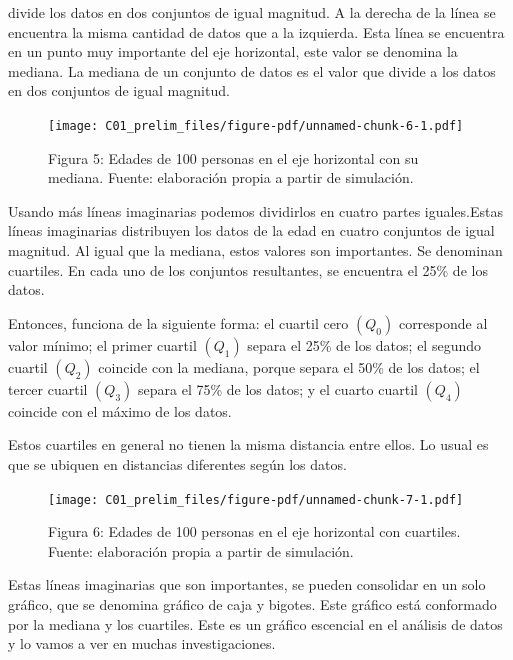 \documentclass[
  letterpaper,
  DIV=11,
  numbers=noendperiod]{scrreprt}
\begin{document}
divide los datos en dos conjuntos de igual magnitud. A la derecha de la
línea se encuentra la misma cantidad de datos que a la izquierda. Esta
línea se encuentra en un punto muy importante del eje horizontal, este
valor se denomina la mediana. La mediana de un conjunto de datos es el
valor que divide a los datos en dos conjuntos de igual magnitud.

\begin{figure}[H]

{\centering \texttt{[image: C01\_prelim\_files/figure-pdf/unnamed-chunk-6-1.pdf]}

}

\caption{Figura 5: Edades de 100 personas en el eje horizontal con su
mediana. Fuente: elaboración propia a partir de simulación.}

\end{figure}%

Usando más líneas imaginarias podemos dividirlos en cuatro partes
iguales.Estas líneas imaginarias distribuyen los datos de la edad en
cuatro conjuntos de igual magnitud. Al igual que la mediana, estos
valores son importantes. Se denominan cuartiles. En cada uno de los
conjuntos resultantes, se encuentra el 25\% de los datos.

Entonces, funciona de la siguiente forma: el cuartil cero \((Q_0)\)
corresponde al valor mínimo; el primer cuartil \((Q_1)\) separa el 25\%
de los datos; el segundo cuartil \((Q_2)\) coincide con la mediana,
porque separa el 50\% de los datos; el tercer cuartil \((Q_3)\) separa
el 75\% de los datos; y el cuarto cuartil \((Q_4)\) coincide con el
máximo de los datos.

Estos cuartiles en general no tienen la misma distancia entre ellos. Lo
usual es que se ubiquen en distancias diferentes según los datos.

\begin{figure}[H]

{\centering \texttt{[image: C01\_prelim\_files/figure-pdf/unnamed-chunk-7-1.pdf]}

}

\caption{Figura 6: Edades de 100 personas en el eje horizontal con
cuartiles. Fuente: elaboración propia a partir de simulación.}

\end{figure}%

Estas líneas imaginarias que son importantes, se pueden consolidar en un
solo gráfico, que se denomina gráfico de caja y bigotes. Este gráfico
está conformado por la mediana y los cuartiles. Este es un gráfico
escencial en el análisis de datos y lo vamos a ver en muchas
investigaciones.
\end{document}
